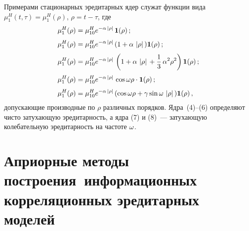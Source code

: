 \begin{multicols}{2}
Примерами стационарных эредитарных ядер служат функции вида $\mu_1^H
(t,\tau) = \mu_1^H (\rho)$, $\rho = t-\tau$, где
\begin{align}
\mu_1^H(\rho) &= \mu_{10}^H e^{-\alpha \,\left\vert\rho\right\vert\,} {\bf 1}(\rho)\,;\\[3pt]
\mu_1^H(\rho) &= \mu_{10}^H e^{-\alpha \,\left\vert\rho\right\vert\,} (1+\alpha\,\left\vert \rho\right\vert\,){\bf 1}(\rho)\,;\\[3pt]
\mu_1^H(\rho) &= \mu_{10}^H e^{-\alpha \,\left\vert\rho\right\vert\,} \left( 1+\alpha\,\left\vert \rho\right\vert\, +\displaystyle\frac{\displaystyle 1\mathstrut}{\displaystyle 3\mathstrut}\, \alpha^2 \rho^2\right ){\bf 1}(\rho)\,;\\[3pt]
\mu_1^H(\rho) &= \mu_{10}^H e^{-\alpha \,\left\vert\rho\right\vert\,} \cos \omega \rho\cdot {\bf 1}(\rho)\,;\\[3pt]
\mu_1^H(\rho) &= \mu_{10}^H e^{-\alpha \,\left\vert\rho\right\vert\,} (\cos \omega \rho+\gamma \sin \omega\,\left\vert \rho\right\vert\,){\bf 1}(\rho)\,,
\end{align}
допускающие производные по  $\rho$ различных порядков. Ядра~(4)--(6)
определяют чисто затухающую эредитарность, а ядра (7) и (8)~---
затухающую колебательную эредитарность на частоте $\omega$.

\section{Априорные методы построения~информационных корреляционных эредитарных моделей}


\end{multicols}

